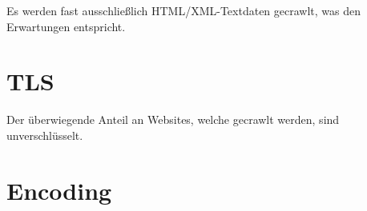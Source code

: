 \documentclass[a4paper,12pt,titlepage=false]{scrreprt}
\begin{document}
Es werden fast ausschließlich HTML/XML-Textdaten gecrawlt, was den Erwartungen entspricht.

\section{TLS}
\vspace{.1cm}
Der überwiegende Anteil an Websites, welche gecrawlt werden, sind unverschlüsselt.



\section{Encoding}
\vspace{.1cm}
\end{document}
